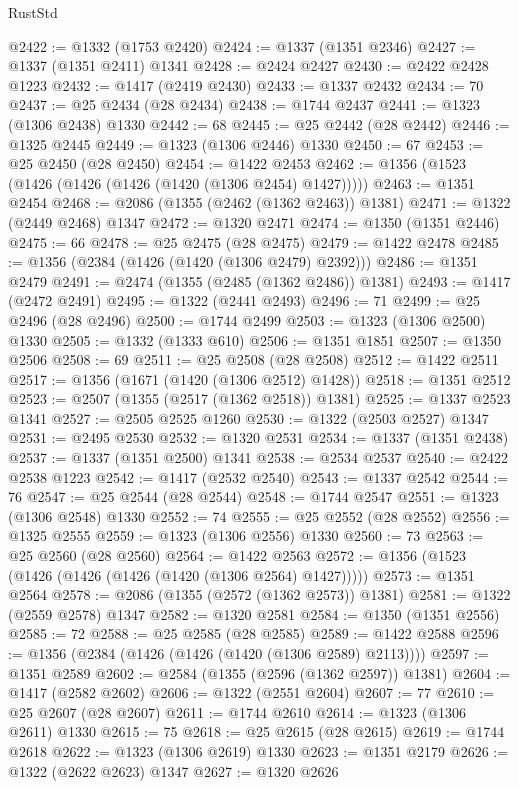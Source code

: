 \begin{lexlean}{RustStd}
\begin{coremodule}
@2422 := @1332 (@1753 @2420)
@2424 := @1337 (@1351 @2346)
@2427 := @1337 (@1351 @2411) @1341
@2428 := @2424 @2427
@2430 := @2422 @2428 @1223
@2432 := @1417 (@2419 @2430)
@2433 := @1337 @2432
@2434 := 70
@2437 := @25 @2434 (@28 @2434)
@2438 := @1744 @2437
@2441 := @1323 (@1306 @2438) @1330
@2442 := 68
@2445 := @25 @2442 (@28 @2442)
@2446 := @1325 @2445
@2449 := @1323 (@1306 @2446) @1330
@2450 := 67
@2453 := @25 @2450 (@28 @2450)
@2454 := @1422 @2453
@2462 := @1356 (@1523 (@1426 (@1426 (@1426 (@1420 (@1306 @2454) @1427)))))
@2463 := @1351 @2454
@2468 := @2086 (@1355 (@2462 (@1362 @2463)) @1381)
@2471 := @1322 (@2449 @2468) @1347
@2472 := @1320 @2471
@2474 := @1350 (@1351 @2446)
@2475 := 66
@2478 := @25 @2475 (@28 @2475)
@2479 := @1422 @2478
@2485 := @1356 (@2384 (@1426 (@1420 (@1306 @2479) @2392)))
@2486 := @1351 @2479
@2491 := @2474 (@1355 (@2485 (@1362 @2486)) @1381)
@2493 := @1417 (@2472 @2491)
@2495 := @1322 (@2441 @2493)
@2496 := 71
@2499 := @25 @2496 (@28 @2496)
@2500 := @1744 @2499
@2503 := @1323 (@1306 @2500) @1330
@2505 := @1332 (@1333 @610)
@2506 := @1351 @1851
@2507 := @1350 @2506
@2508 := 69
@2511 := @25 @2508 (@28 @2508)
@2512 := @1422 @2511
@2517 := @1356 (@1671 (@1420 (@1306 @2512) @1428))
@2518 := @1351 @2512
@2523 := @2507 (@1355 (@2517 (@1362 @2518)) @1381)
@2525 := @1337 @2523 @1341
@2527 := @2505 @2525 @1260
@2530 := @1322 (@2503 @2527) @1347
@2531 := @2495 @2530
@2532 := @1320 @2531
@2534 := @1337 (@1351 @2438)
@2537 := @1337 (@1351 @2500) @1341
@2538 := @2534 @2537
@2540 := @2422 @2538 @1223
@2542 := @1417 (@2532 @2540)
@2543 := @1337 @2542
@2544 := 76
@2547 := @25 @2544 (@28 @2544)
@2548 := @1744 @2547
@2551 := @1323 (@1306 @2548) @1330
@2552 := 74
@2555 := @25 @2552 (@28 @2552)
@2556 := @1325 @2555
@2559 := @1323 (@1306 @2556) @1330
@2560 := 73
@2563 := @25 @2560 (@28 @2560)
@2564 := @1422 @2563
@2572 := @1356 (@1523 (@1426 (@1426 (@1426 (@1420 (@1306 @2564) @1427)))))
@2573 := @1351 @2564
@2578 := @2086 (@1355 (@2572 (@1362 @2573)) @1381)
@2581 := @1322 (@2559 @2578) @1347
@2582 := @1320 @2581
@2584 := @1350 (@1351 @2556)
@2585 := 72
@2588 := @25 @2585 (@28 @2585)
@2589 := @1422 @2588
@2596 := @1356 (@2384 (@1426 (@1426 (@1420 (@1306 @2589) @2113))))
@2597 := @1351 @2589
@2602 := @2584 (@1355 (@2596 (@1362 @2597)) @1381)
@2604 := @1417 (@2582 @2602)
@2606 := @1322 (@2551 @2604)
@2607 := 77
@2610 := @25 @2607 (@28 @2607)
@2611 := @1744 @2610
@2614 := @1323 (@1306 @2611) @1330
@2615 := 75
@2618 := @25 @2615 (@28 @2615)
@2619 := @1744 @2618
@2622 := @1323 (@1306 @2619) @1330
@2623 := @1351 @2179
@2626 := @1322 (@2622 @2623) @1347
@2627 := @1320 @2626

\end{coremodule}
\end{lexlean}
